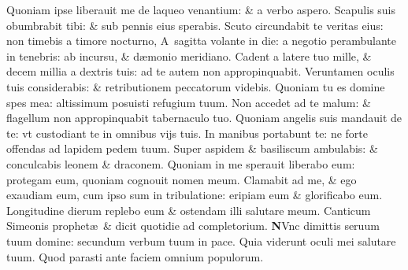 \documentclass[a5paper,10pt]{book}
\def\ae{æ}
\begin{document}
\begin{multicols*}{2}
\newline \color{red} Q\color{black}uoniam ipse liberauit me de laqueo venantium: \& a verbo aspero.
\newline \color{red} S\color{black}capulis suis obumbrabit tibi: \& sub pennis eius sperabis.
\newline \color{red} S\color{black}cuto circundabit te veritas eius: non timebis a timore nocturno,
\newline \color{red} A\color{black}\ sagitta volante in die: a negotio perambulante in tenebris: ab incursu, \& d\ae monio meridiano.
\newline \color{red} C\color{black}adent a latere tuo mille, \& decem millia a dextris tuis: ad te autem non appropinquabit.
\newline \color{red} V\color{black}eruntamen oculis tuis considerabis: \& retributionem peccatorum videbis.
\newline \color{red} Q\color{black}uoniam tu es domine spes mea: altissimum posuisti refugium tuum.
\newline \color{red} N\color{black}on accedet ad te malum: \& flagellum non appropinquabit tabernaculo tuo.
\newline \color{red} Q\color{black}uoniam angelis suis mandauit de te: vt custodiant te in omnibus vijs tuis.
\newline \color{red} I\color{black}n manibus portabunt te: ne forte offendas ad lapidem pedem tuum.
\newline \color{red} S\color{black}uper aspidem \& basiliscum ambulabis: \& conculcabis leonem \& draconem.
\newline \color{red} Q\color{black}uoniam in me sperauit liberabo  eum: protegam eum, quoniam cognouit nomen meum.
\newline \color{red} C\color{black}lamabit ad me, \& ego exaudiam eum, cum ipso sum in tribulatione: eripiam eum \& glorificabo eum.
\newline \color{red} L\color{black}ongitudine dierum replebo eum \& ostendam illi salutare meum.
\newline \color{red} \hypertarget{Nunc}{Canticum} Simeonis prophet\ae \ \& dicit quotidie ad completorium. \color{black}
\vspace{-.5em}
\lettrine[lines=2]{\bfseries \color{red} N}{}Vnc dimittis seruum tuum domine: secundum verbum tuum in pace.
\newline \color{red} Q\color{black}uia viderunt oculi mei salutare tuum.
\newline \color{red} Q\color{black}uod parasti ante faciem omnium populorum.

\end{multicols*}
\end{document}
